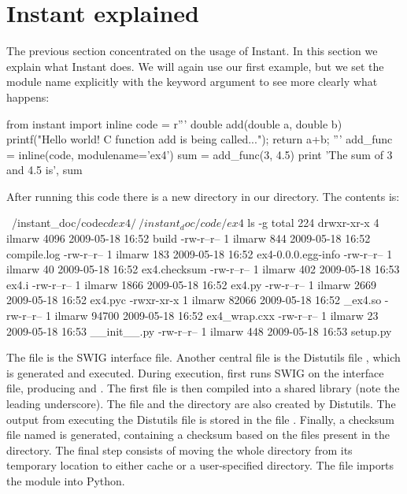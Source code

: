 \section{Instant explained}
\label{wilbers:sec:explained}

The previous section concentrated on the usage of Instant.  In this
section we explain what Instant does.  We will again use our first
example, but we set the module name explicitly with the keyword
argument  to see more clearly what happens:
\begin{python}
from instant import inline
code = r'''
double add(double a, double b)
{
  printf("Hello world! C function add is being called...\n");
  return a+b;
}'''
add_func = inline(code, modulename='ex4')
sum = add_func(3, 4.5)
print 'The sum of 3 and 4.5 is', sum
\end{python}
After running this code there is a new directory  in our directory.
The contents is:
\begin{progoutput}
~/instant_doc/code$ cd ex4/
~/instant_doc/code/ex4$ ls -g
total 224
drwxr-xr-x 4 ilmarw  4096 2009-05-18 16:52 build
-rw-r--r-- 1 ilmarw   844 2009-05-18 16:52 compile.log
-rw-r--r-- 1 ilmarw   183 2009-05-18 16:52 ex4-0.0.0.egg-info
-rw-r--r-- 1 ilmarw    40 2009-05-18 16:52 ex4.checksum
-rw-r--r-- 1 ilmarw   402 2009-05-18 16:53 ex4.i
-rw-r--r-- 1 ilmarw  1866 2009-05-18 16:52 ex4.py
-rw-r--r-- 1 ilmarw  2669 2009-05-18 16:52 ex4.pyc
-rwxr-xr-x 1 ilmarw 82066 2009-05-18 16:52 _ex4.so
-rw-r--r-- 1 ilmarw 94700 2009-05-18 16:52 ex4_wrap.cxx
-rw-r--r-- 1 ilmarw    23 2009-05-18 16:53 __init__.py
-rw-r--r-- 1 ilmarw   448 2009-05-18 16:53 setup.py
\end{progoutput}
The file  is the SWIG interface file.
Another central file is the Distutils file , which is generated
and executed. During execution,  first runs SWIG on the interface file,
producing  and . The first file
is then compiled into a shared library  
(note the leading underscore). The file 
and the directory  are also created by Distutils.
The output from executing the Distutils file is stored in the file
.  Finally, a checksum file named
 is generated, containing a checksum based on
the files present in the directory. The final step consists of moving
the whole directory from its temporary location to either cache or a
user-specified directory. The file 
imports the module
 into Python.

